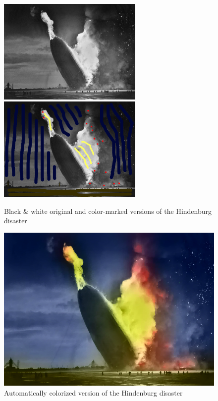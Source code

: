 \documentclass{article}
\begin{document}
\begin{figure}
    \centering
    \includegraphics[width=7cm]{../code/results/colorization_hindenburg_ref.png}
    \includegraphics[width=7cm]{../code/results/colorization_hindenburg_target.png}
    \caption{Black \& white original and color-marked versions of the Hindenburg disaster}
    \label{fig:hindenburg_original}
\end{figure}

\begin{figure}
    \centering
    \includegraphics[width=13cm]{../code/results/colorization_hindenburg_new.png}
    \caption{Automatically colorized version of the Hindenburg disaster}
    \label{fig:hindenburg}
\end{figure}
\end{document}
